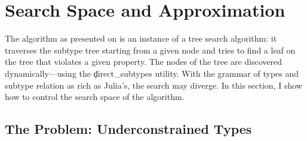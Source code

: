 \begin{description}

\end{description}

\section{Search Space and Approximation}%
\label{sec:approx:space}

The algorithm as presented on  is an instance of a tree
search algorithm: it traverses the subtype tree starting from a given node and
tries to find a leaf on the tree that violates a given property. The nodes of
the tree are discovered dynamically---using the \c{direct_subtypes} utility.
%
With the grammar of types and subtype relation as rich as Julia's, the search
may diverge. In this section, I show how to control the search space of the
algorithm.

\subsection{The Problem: Underconstrained Types}%
\label{ssect:uconstr-types}

